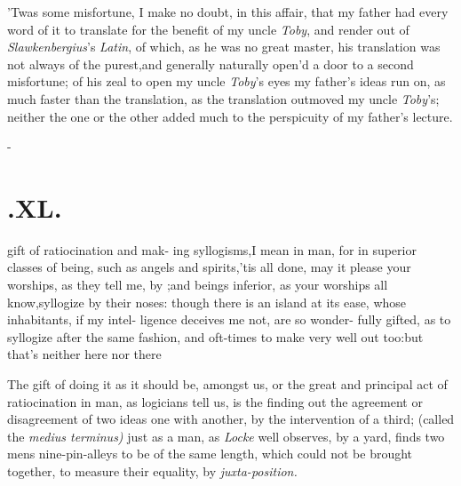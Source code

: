 \documentclass{article}
\begin{document}
’Twas some misfortune, I make no\break
doubt, in this affair,
that my father had every word of it to translate for the bene\-fit of
my uncle \textit{Toby}, and render out of
\textit{Slawkenbergius}’s \textit{Latin}, of which, as he was no
great master, his translation was not always of the
purest,\tsk and generally\break {} naturally open’d a door to a second
misfortune;\tsk {}\break
of his zeal to open my uncle \textit{Toby}’s eyes\break
\tsh my father’s ideas run on, as much faster than the translation, as
the translation outmoved my uncle
\textit{Toby}’s;\tsh\break
neither the one or the other added much\break
to the perspicuity of my father’s lecture.

\null\kern-\baselineskip
\section{.\quad  XL.}

 gift of ratiocination and mak-\break
ing syllogisms,\tsh I mean in man,\break
\tsk for in superior classes of being, such\break
as angels and spirits,\tsh ’tis all done, may\break
it please your worships, as they tell me,\break
by ;\tsk and beings inferior, as\break
your worships all know,\tsk\!\tsk syllogize by\break
their noses: though there is an island\break
{}\break
at its ease, whose inhabitants, if my intel-\break
ligence deceives me not, are so wonder-\break
fully gifted, as to syllogize after the same\break
fashion, and oft-times to make very well\break
out too:\tsh but that’s neither here nor\break
there\tsh

The gift of doing it as it should be, amongst us, \tsk or the
great and principal act of ratiocination in man, as logicians tell
us, is the finding out the agreement or disagreement of two ideas
one with another, by the intervention of a third; (called the
\textit{medius terminus)\sic} just as a man, as \textit{Locke} well
observes, by a yard, finds two mens nine-pin-alleys to be of the same
length, which could not be brought together, to measure their
equality, by \textit{juxta-position.}
\end{document}
